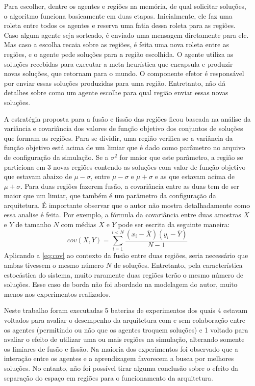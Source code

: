 Para escolher, dentre os agentes e regiões na memória, de qual solicitar soluções, o algoritmo funciona basicamente em duas etapas. Inicialmente, ele faz uma roleta entre todos os agentes e reserva uma fatia dessa roleta para as regiões. Caso algum agente seja sorteado, é enviado uma mensagem diretamente para ele. Mas caso a escolha recaia sobre as regiões, é feita uma nova roleta entre as regiões, e o agente pede soluções para a região escolhida. O agente utiliza as soluções recebidas para executar a meta-heurística que encapsula e produzir novas soluções, que retornam para o mundo. O componente efetor é responsável por enviar essas soluções produzidas para uma região. Entretanto,  não dá detalhes sobre como um agente escolhe para qual região enviar essas novas soluções. 

A estratégia proposta para a fusão e fissão das regiões ficou baseada na análise da variância e covariância dos valores de função objetivo dos conjuntos de soluções que formam as regiões. Para se dividir, uma região verifica se a variância da função objetivo está acima de um limiar que é dado como parâmetro no arquivo de configuração da simulação. Se a $\sigma^{2}$ for maior que este parâmetro, a  região se particiona em 3 novas regiões contendo as soluções com valor de função objetivo que estavam abaixo de $\mu - \sigma$, entre $\mu - \sigma$ e $\mu + \sigma$ e as que estavam acima de $\mu + \sigma$. Para duas regiões fazerem fusão, a covariância entre as duas tem de ser maior que um limiar, que também é um parâmetro da configuração da arquitetura. É importante observar que o autor não mostra detalhadamente como essa analise é feita. Por exemplo, a fórmula da covariância entre duas amostras $X$ e $Y$ de tamanho $N$ com médias $\overline{X}$ e $\overline{Y}$ pode ser escrita da seguinte maneira:
\begin{equation}
\label{eq:cov}
    cov(X,Y) = \sum_{i=1}^{i<N}\frac{(x_i - \overline{X})(y_i - \overline{Y})}{N - 1} 
\end{equation} 
Aplicando a \autoref{eq:cov} ao contexto da fusão entre duas regiões, seria necessário que ambas tivessem o mesmo número $N$ de soluções. Entretanto, pela característica estocástica do sistema, muito raramente duas regiões terão o mesmo número de soluções. Esse caso de borda não foi abordado na modelagem do autor, muito menos nos experimentos realizados. 

Neste trabalho foram executadas 5 baterias de experimentos dos quais 4 estavam voltados para avaliar o desempenho da arquitetura com e sem colaboração entre os agentes (permitindo ou não que os agentes troquem soluções) e 1 voltado para avaliar o efeito de utilizar uma ou mais regiões na simulação, alterando somente os limiares de fusão e fissão. Na maioria dos experimentos foi observado que a interação entre os agentes e a aprendizagem favorecem a busca por melhores soluções. No entanto, não foi possível tirar alguma conclusão sobre o efeito da separação do espaço em regiões para o funcionamento da arquitetura.

